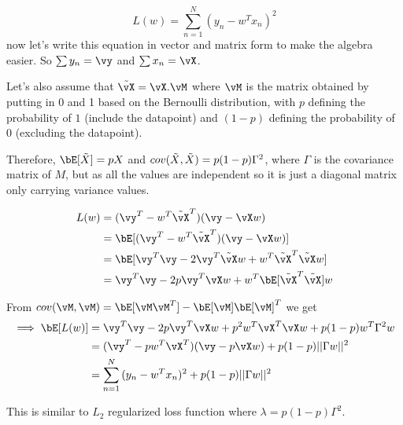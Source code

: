 \documentclass[a4paper,11pt]{article}
\begin{document}
\begin{mlsolution}

$$
L(w) = \sum_{n=1}^{N}{(y_n - w^Tx_n)^2}
$$
now let's write this equation in vector and matrix form to make the algebra easier. So $\sum{y_n} = \vy$ and $\sum{x_n} = \vX$.

Let's also assume that $\Tilde{\vX} = \vX . \vM$ where $\vM$ is the matrix obtained by putting in 0 and 1 based on the Bernoulli distribution, with $p$ defining the probability of $1$ (include the datapoint) and $(1-p)$ defining the probability of $0$ (excluding the datapoint).

Therefore, $\bE[\Tilde{X}] = pX$ and $cov(\Tilde{X}, \Tilde{X}) = p(1-p)\Gamma^2$, where $\Gamma$ is the covariance matrix of $M$, but as all the values are independent so it is just a diagonal matrix only carrying variance values.

\begin{align*}
L(w) &= (\vy^T - w^T\Tilde{\vX}^T)(\vy - \vX w)\\
&= \bE[(\vy^T - w^T\Tilde{\vX}^T)(\vy - \vX w)]\\
&= \bE[\vy^T\vy - 2\vy^T\Tilde{\vX}w + w^T\Tilde{\vX}^T\Tilde{\vX}w]\\
&= \vy^T\vy - 2p\vy^T\vX w + w^T\bE[\Tilde{\vX}^T\Tilde{\vX}]w
\end{align*}

From $cov(\vM, \vM) = \bE[\vM\vM^T] - \bE[\vM]\bE[\vM]^T$ we get 
\begin{align*}
\implies \bE[L(w)] &= \vy^T\vy - 2p\vy^T\vX w + p^2w^T\vX^T\vX w + p(1-p)w^T\Gamma^2w\\
&= (\vy^T - p w^T\vX^T)(\vy - p\vX w) + p(1-p)||\Gamma w||^2\\
&= \sum_{n=1}^{N}{(y_n - w^T x_n)^2} + p(1-p)||\Gamma w||^2
\end{align*}

This is similar to $L_2$ regularized loss function where $\lambda = p(1-p)\Gamma^2$.

\end{mlsolution}
\end{document}
